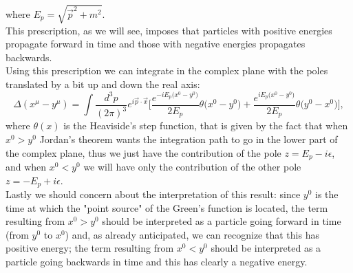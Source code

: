 where $E_p=\sqrt{\vec p^2+m^2}$.\\
This prescription, as we will see, imposes that particles with positive energies propagate forward in time and those with negative energies propagates backwards.\\
Using this prescription we can integrate in the complex plane with the poles translated by a bit up and down the real axis:
\begin{equation*}
    \Delta(x^\mu-y^\mu)=\int\frac{d^3p}{(2\pi)^3}e^{i\vec p\cdot \vec x}\bigg[\frac{e^{-iE_p\big(x^0-y^0\big)}}{2E_p}\theta\big(x^0-y^0\big)+\frac{e^{iE_p\big(x^0-y^0\big)}}{2E_p}\theta\big(y^0-x^0\big)\bigg],
\end{equation*}
where $\theta(x)$ is the Heaviside's step function, that is given by the fact that when $x^0>y^0$ Jordan's theorem wants the integration path to go in the lower part of the complex plane, thus we just have the contribution of the pole $z=E_p-i\epsilon$, and when $x^0<y^0$ we will have only the contribution of the other pole $z=-E_p+i\epsilon$.\\

Lastly we should concern about the interpretation of this result: since $y^0$ is the time at which the "point source" of the Green's function is located, the term resulting from $x^0>y^0$ should be interpreted as a particle going forward in time (from $y^0$ to $x^0$) and, as already anticipated, we can recognize that this has positive energy; the term resulting from $x^0<y^0$ should be interpreted as a particle going backwards in time and this has clearly a negative energy. 

